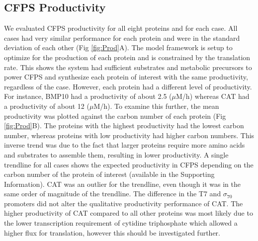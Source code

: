 \documentclass[journal=asbcd6,manuscript=article]{achemso}
\begin{document}
\subsection{CFPS Productivity}
We evaluated CFPS productivity for all eight proteins and for each case. 
All cases had very similar performance for each protein and were in the standard deviation of each other (Fig \ref{fig:Prod}A). 
The model framework is setup to optimize for the production of each protein and is constrained by the translation rate.  
This shows the system had sufficient substrates and metabolic precursors to power CFPS and synthesize each protein of interest with the same productivity, regardless of the case.
However, each protein had a different level of productivity.
For instance, BMP10 had a productivity of about 2.5 ($\mu$M/h) whereas CAT had a productivity of about 12 ($\mu$M/h).
To examine this further, the mean productivity was plotted against the carbon number of each protein (Fig \ref{fig:Prod}B).
The proteins with the highest productivity had the lowest carbon number, whereas proteins with low productivity had higher carbon numbers.
This inverse trend was due to the fact that larger proteins require more amino acids and substrates to assemble them, resulting in lower productivity.
A single trendline for all cases shows the expected productivity in CFPS depending on the carbon number of the protein of interest (available in the Supporting Information). 
CAT was an outlier for the trendline, even though it was in the same order of magnitude of the trendline.
The difference in the T7 and  $\sigma_{70}$ promoters did not alter the qualitative productivity performance of CAT. 
The higher productivity of CAT compared to all other proteins was most likely due to the lower transcription requirement of cytidine triphosphate which allowed a higher flux for translation, however this should be investigated further.
\end{document}

